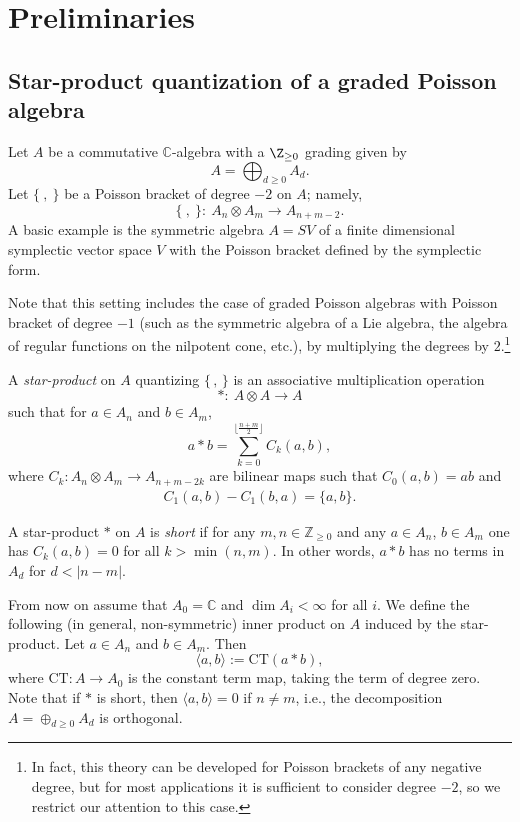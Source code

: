 \section{Preliminaries}\label{section2}

\subsection{Star-product quantization of a graded Poisson algebra}
Let $A$ be a commutative ${\mathbb C}$-algebra with a $\Z_{\geq 0}$ grading given by
\[
A = \bigoplus_{d \geq 0} A_d.
\]
Let $\{~,~\}$ be a Poisson bracket of degree $-2$ on $A$; namely,
\[
\{~,~\} \colon \ A_n \otimes A_m \to A_{n+m-2}.
\]
A basic example is the symmetric algebra $A=SV$ of a finite dimensional symplectic vector space $V$
with the Poisson bracket defined by the symplectic form.

Note that this setting includes the case of graded Poisson algebras with Poisson bracket of degree $-1$ (such as the symmetric algebra of a Lie algebra, the algebra of regular functions on the nilpotent cone, etc.), by multiplying the degrees by $2$.\footnote{In fact, this theory can be developed for Poisson brackets of any negative degree, but for most applications it is sufficient to consider degree $-2$, so we restrict our attention to this case.}

\begin{Definition}
A \emph{star-product} on $A$ quantizing $\lbrace\,,\,\rbrace$ is an associative multiplication operation
\[
*\colon \ A \otimes A \to A
\]
such that for $a \in A_n$ and $b \in A_m$,
\[
a*b = \sum_{k = 0}^{\lfloor \frac{n+m}{2}\rfloor} C_k(a,b),
\]
where $C_k \colon A_n \otimes A_m \to A_{n+m-2k}$ are bilinear maps such that $C_0(a,b) = a b$ and
\begin{gather*}
C_1(a,b) - C_1(b,a) = \{a,b\}.
\end{gather*}
\end{Definition}

\begin{Definition} A star-product $*$ on $A$ is \emph{short} if
for any $m,n\in {\mathbb Z}_{\ge 0}$ and any $a \in A_n$, $b \in A_m$ one has $C_k(a,b) = 0$ for all $k > \min(n,m)$. In other words, $a * b$ has no terms in $A_d$ for $d < |n - m|$.
\end{Definition}

From now on assume that $A_0={\mathbb C}$ and $\dim A_i<\infty$ for all $i$. We define the following (in general, non-symmetric) inner product on $A$ induced by the star-product. Let $a \in A_n$ and $b \in A_m$. Then
\[
\langle a, b \rangle := \text{CT}(a * b),
\]
where $\text{CT}\colon A \to A_0$ is the constant term map, taking the term of degree zero. Note that if $*$ is short, then $\langle a, b \rangle = 0$ if $n \neq m$, i.e., the decomposition $A=\oplus_{d\ge 0}A_d$ is orthogonal.

